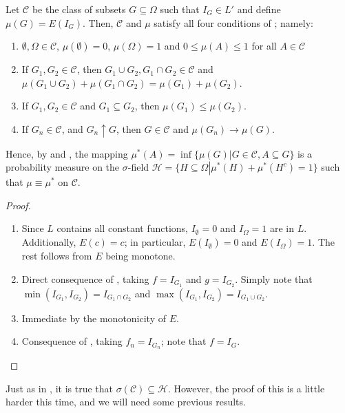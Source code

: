 \begin{lemm}\label{lemma:extension of E to monotone class}
		Let \(\mathcal{C}\) be the class of subsets \(G\subseteq\Omega\) such that \(I_G\in L'\) and define \(\mu(G)=E(I_G)\). Then, \(\mathcal{C}\) and \(\mu\) satisfy all four conditions of ; namely:
		\begin{enumerate}
				\item \label{lemma:extension of E to monotone class
						coincides}\(\emptyset,\Omega\in\mathcal{C}\), \(\mu(\emptyset)=0\), \(\mu(\Omega)=1\) and
						\(0\leq\mu(A)\leq1\) for all \(A\in\mathcal{C}\)
				\item \label{lemma:extension of E to monotone class additivity} If
						\(G_1,G_2\in\mathcal{C}\), then \(G_1\cup G_2,G_1\cap G_2\in\mathcal{C}\) and
						\(\mu(G_1\cup G_2)+\mu(G_1\cap G_2)=\mu(G_1)+\mu(G_2)\).
				\item \label{lemma:extension of E to monotone class is monotone} If
						\(G_1,G_2\in\mathcal{C}\) and \(G_1\subseteq G_2\), then \(\mu(G_1)\leq\mu(G_2)\).
				\item \label{lemma:extension of E to monotone class incerasing limits} If
						\(G_n\in\mathcal{C}\), and \(G_n\uparrow G\), then \(G\in\mathcal{C}\) and
						\(\mu(G_n)\to\mu(G)\).
		\end{enumerate}
Hence, by  and , the mapping \(\mu^*(A)=\inf\{\mu(G)\left|G\in\mathcal{C}, A\subseteq G\right.\}\) is a probability measure on the \(\sigma\)-field \(\mathcal{H}=\{H\subseteq\Omega\left|\mu^*(H)+\mu^*(H^c)=1\right.\}\) such that \(\mu\equiv\mu^*\) on \(\mathcal{C}\).
\end{lemm}
\begin{proof}
		\begin{enumerate}
				\item Since \(L\) contains all constant functions, \(I_{\emptyset}=0\) and \(I_{\Omega}=1\) are in \(L\). Additionally, \(E(c)=c\); in particular, \(E(I_{\emptyset})=0\) and \(E(I_{\Omega})=1\). The rest follows from \(E\) being monotone.
				\item Direct consequence of , taking \(f=I_{G_1}\) and \(g=I_{G_2}\). Simply note that \(\min(I_{G_1},I_{G_2})=I_{G_1\cap G_2}\) and \(\max(I_{G_1},I_{G_2})=I_{G_1\cup G_2}\).
				\item Immediate by the monotonicity of \(E\).
				\item Consequence of , taking \(f_n=I_{G_n}\); note that \(f=I_{G}\).
		\end{enumerate}
\end{proof}
Just as in , it is true that \(\sigma(\mathcal{C})\subseteq\mathcal{H}\). However, the proof of this is a little harder this time, and we will need some previous results.

